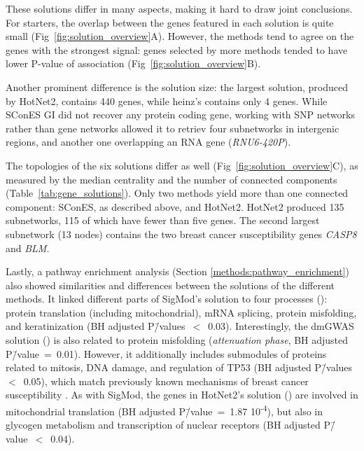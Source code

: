 \documentclass[10pt,letterpaper]{article}
\begin{document}
These solutions differ in many aspects, making it hard to draw joint conclusions. For starters, the overlap between the genes featured in each solution is quite small (Fig~\ref{fig:solution_overview}A). However, the methods tend to agree on the genes with the strongest signal: genes selected by more methods tended to have lower P-value of association (Fig~\ref{fig:solution_overview}B).

Another prominent difference is the solution size: the largest solution, produced by HotNet2, contains 440 genes, while heinz's contains only 4 genes. While SConES GI did not recover any protein coding gene, working with SNP networks rather than gene networks allowed it to retriev four subnetworks in intergenic regions, and another one overlapping an RNA gene (\emph{RNU6-420P}).

The topologies of the six solutions differ as well (Fig~\ref{fig:solution_overview}C), as measured by the median centrality  and the number of connected components (Table~\ref{tab:gene_solutions}). Only two methods yield more than one connected component: SConES, as described above, and HotNet2. HotNet2 produced 135 subnetworks, 115 of which have fewer than five genes. The second largest subnetwork (13 nodes) contains the two breast cancer susceptibility genes \emph{CASP8} and \emph{BLM}.

Lastly, a pathway enrichment analysis (Section \ref{methods:pathway_enrichment}) also showed similarities and differences between the solutions of the different methods. It linked different parts of SigMod's solution to four processes (): protein translation (including mitochondrial), mRNA splicing, protein misfolding, and keratinization (BH adjusted P\=/values~$<$~0.03). Interestingly, the dmGWAS solution () is also related to protein misfolding (\emph{attenuation phase}, BH adjusted P\=/value~=~0.01). However, it additionally includes submodules of proteins related to mitosis, DNA damage, and regulation of TP53 (BH adjusted P\=/values~$<$~0.05), which match previously known mechanisms of breast cancer susceptibility \cite{nielsen_hereditary_2016}. As with SigMod, the genes in HotNet2's solution () are involved in mitochondrial translation (BH adjusted P\=/value~=~1.87 \texttimes{} 10\textsuperscript{-4}), but also in glycogen metabolism and transcription of nuclear receptors (BH adjusted P\=/value~$<$~0.04).
\end{document}
